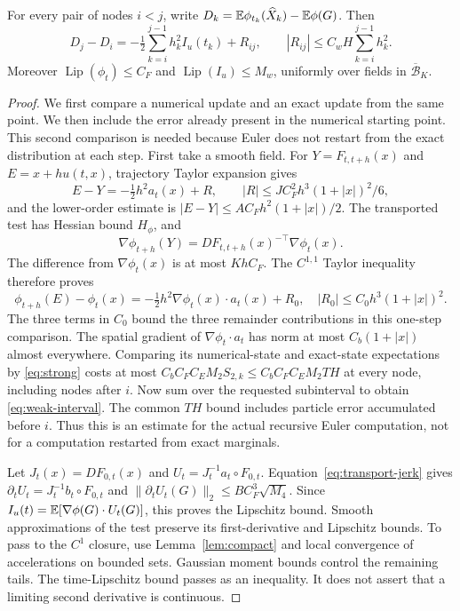 \begin{lemma}
\label{lem:weak}
For every pair of nodes $i<j$, write
$D_k=\mathbb E\phi_{t_k}(\widehat X_k)-\mathbb E\phi(G)$. Then
\begin{equation}
 D_j-D_i=-\tfrac12\sum_{k=i}^{j-1}h_k^2I_u(t_k)+R_{ij},\qquad
 |R_{ij}|\le C_wH\sum_{k=i}^{j-1}h_k^2.
 \label{eq:weak-interval}
\end{equation}
Moreover $\operatorname{Lip}(\phi_t)\le C_F$ and
$\operatorname{Lip}(I_u)\le M_w$, uniformly over fields in
$\overline{\mathcal B}_K$.
\end{lemma}
\begin{proof}
We first compare a numerical update and an exact update from the same point.
We then include the error already present in the numerical starting point.
This second comparison is needed because Euler does not restart from the
exact distribution at each step.
First take a smooth field. For $Y=F_{t,t+h}(x)$ and $E=x+hu(t,x)$,
trajectory Taylor expansion gives
\[
 E-Y=-\tfrac12h^2a_t(x)+R,\qquad
 |R|\le JC_F^2h^3(1+|x|)^2/6,
\]
and the lower-order estimate is $|E-Y|\le A C_F h^2(1+|x|)/2$.
The transported test has Hessian bound $H_\phi$, and
\[
 \nabla\phi_{t+h}(Y)=DF_{t,t+h}(x)^{-\top}\nabla\phi_t(x).
\]
The difference from $\nabla\phi_t(x)$ is at most $KhC_F$.
The $C^{1,1}$ Taylor inequality therefore proves
\[
 \phi_{t+h}(E)-\phi_t(x)
 =-\tfrac12h^2\nabla\phi_t(x)\cdot a_t(x)+R_0,
 \quad |R_0|\le C_0h^3(1+|x|)^2.
\]
The three terms in $C_0$ bound the three remainder contributions in this
one-step comparison.
The spatial gradient of $\nabla\phi_t\cdot a_t$ has norm at most
$C_b(1+|x|)$ almost everywhere. Comparing its numerical-state and exact-state
expectations by \eqref{eq:strong} costs at most
$C_bC_FC_EM_2 S_{2,k}\le C_bC_FC_EM_2TH$ at every node, including nodes after $i$.
Now sum over the requested subinterval to obtain \eqref{eq:weak-interval}.
The common $TH$ bound includes particle error accumulated before $i$.
Thus this is an estimate for the actual recursive Euler computation, not
for a computation restarted from exact marginals.

Let $J_t(x)=DF_{0,t}(x)$ and $U_t=J_t^{-1}a_t\circ F_{0,t}$.
Equation~\eqref{eq:transport-jerk} gives
$\partial_tU_t=J_t^{-1}b_t\circ F_{0,t}$ and
$\|\partial_tU_t(G)\|_2\le BC_F^3\sqrt{M_4}$. Since
$I_u(t)=\mathbb E[\nabla\phi(G)\cdot U_t(G)]$, this proves the Lipschitz bound.
Smooth approximations of the test preserve its first-derivative and
Lipschitz bounds. To pass to the $C^1$ closure, use
Lemma~\ref{lem:compact} and local convergence of accelerations on bounded
sets. Gaussian moment bounds control the remaining tails. The time-Lipschitz
bound passes as an inequality. It does not assert that a limiting second
derivative is continuous.
\end{proof}

